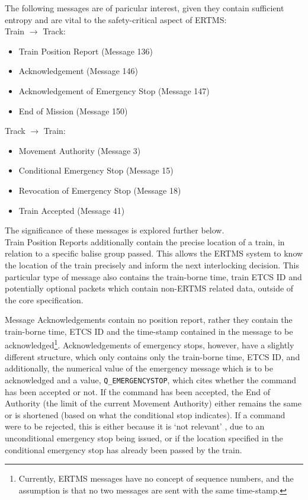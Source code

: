 \documentclass[twoside,11pt,a4paper]{article}
\begin{document}
The following messages are of paricular interest, given they contain sufficient entropy and are vital to the safety-critical aspect of ERTMS:\\
Train $\rightarrow$ Track:
\begin{itemize}[nolistsep]
\item Train Position Report (Message 136)
\item Acknowledgement (Message 146)
\item Acknowledgement of Emergency Stop (Message 147)
\item End of Mission (Message 150)
\end{itemize}
Track $\rightarrow$ Train:
\begin{itemize}[nolistsep]
\item Movement Authority (Message 3)
\item Conditional Emergency Stop (Message 15)
\item Revocation of Emergency Stop (Message 18)
\item Train Accepted (Message 41)
\end{itemize}
The significance of these messages is explored further below.\\
Train Position Reports additionally contain the precise location of a train, in relation to a specific balise group passed. This allows the ERTMS system to know the location of the train precisely and inform the next interlocking decision. This particular type of message also contains the train-borne time, train ETCS ID and potentially optional packets which contain non-ERTMS related data, outside of the core specification.

Message Acknowledgements contain no position report, rather they contain the train-borne time, ETCS ID and the time-stamp contained in the message to be acknowledged\footnote{Currently, ERTMS messages have no concept of sequence numbers, and the assumption is that no two messages are sent with the same time-stamp.}. Acknowledgements of emergency stops, however, have a slightly different structure, which only contains only the train-borne time, ETCS ID, and additionally, the numerical value of the emergency message which is to be acknowledged and a value, \texttt{Q\_EMERGENCYSTOP}, which cites whether the command has been accepted or not. If the command has been accepted, the End of Authority (the limit of the current Movement Authority) either remains the same or is shortened (based on what the conditional stop indicates). If a command were to be rejected, this is either because it is `not relevant' \citep[p. 70]{SUBSET-026-7}, due to an unconditional emergency stop being issued, or if the location specified in the conditional emergency stop has already been passed by the train.
\end{document}
